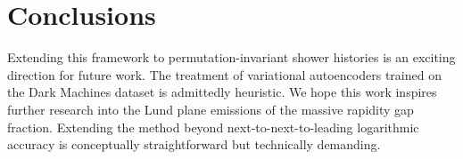 \section{Conclusions}\label{sec:conclusions}

Extending this framework to permutation-invariant shower histories is an
exciting direction for future work. The treatment of variational
autoencoders trained on the Dark Machines dataset is admittedly
heuristic. We hope this work inspires further research into the Lund
plane emissions of the massive rapidity gap fraction. Extending the
method beyond next-to-next-to-leading logarithmic accuracy is
conceptually straightforward but technically demanding.

